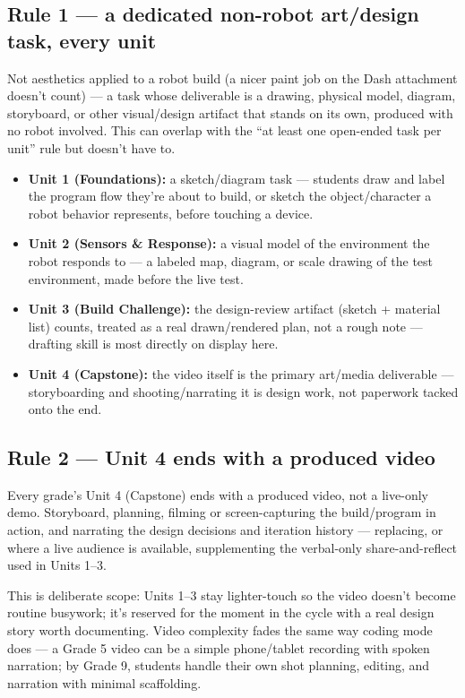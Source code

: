 \documentclass[10pt, a4paper]{article}
\begin{document}
\subsection{Rule 1 --- a dedicated non-robot art/design task, every unit}

Not aesthetics applied to a robot build (a nicer paint job on the Dash attachment doesn't count) --- a task whose deliverable is a drawing, physical model, diagram, storyboard, or other visual/design artifact that stands on its own, produced with no robot involved. This can overlap with the ``at least one open-ended task per unit'' rule but doesn't have to.

\begin{itemize}
\item \textbf{Unit 1 (Foundations):} a sketch/diagram task --- students draw and label the program flow they're about to build, or sketch the object/character a robot behavior represents, before touching a device.
\item \textbf{Unit 2 (Sensors \& Response):} a visual model of the environment the robot responds to --- a labeled map, diagram, or scale drawing of the test environment, made before the live test.
\item \textbf{Unit 3 (Build Challenge):} the design-review artifact (sketch + material list) counts, treated as a real drawn/rendered plan, not a rough note --- drafting skill is most directly on display here.
\item \textbf{Unit 4 (Capstone):} the video itself is the primary art/media deliverable --- storyboarding and shooting/narrating it is design work, not paperwork tacked onto the end.
\end{itemize}

\subsection{Rule 2 --- Unit 4 ends with a produced video}

Every grade's Unit 4 (Capstone) ends with a produced video, not a live-only demo. Storyboard, planning, filming or screen-capturing the build/program in action, and narrating the design decisions and iteration history --- replacing, or where a live audience is available, supplementing the verbal-only share-and-reflect used in Units 1--3.

This is deliberate scope: Units 1--3 stay lighter-touch so the video doesn't become routine busywork; it's reserved for the moment in the cycle with a real design story worth documenting. Video complexity fades the same way coding mode does --- a Grade 5 video can be a simple phone/tablet recording with spoken narration; by Grade 9, students handle their own shot planning, editing, and narration with minimal scaffolding.
\end{document}
